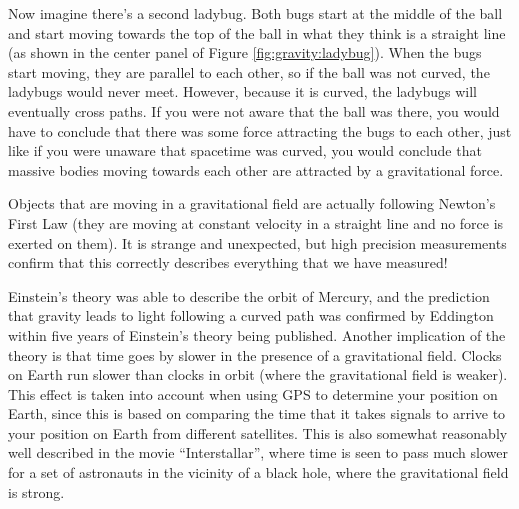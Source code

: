 
Now imagine there's a second ladybug. Both bugs start at the middle of the ball and start moving towards the top of the ball in what they think is a straight line (as shown in the center panel of Figure \ref{fig:gravity:ladybug}). When the bugs start moving, they are parallel to each other, so if the ball was not curved, the ladybugs would never meet. However, because it is curved, the ladybugs will eventually cross paths. If you were not aware that the ball was there, you would have to conclude that there was some force attracting the bugs to each other, just like if you were unaware that spacetime was curved, you would conclude that massive bodies moving towards each other are attracted by a gravitational force.

Objects that are moving in a gravitational field are actually following Newton's First Law (they are moving at constant velocity in a straight line and no force is exerted on them). It is strange and unexpected, but high precision measurements confirm that this correctly describes everything that we have measured!

Einstein's theory was able to describe the orbit of Mercury, and the prediction that gravity leads to light following a curved path was confirmed by Eddington within five years of Einstein's theory being published. Another implication of the theory is that time goes by slower in the presence of a gravitational field. Clocks on Earth run slower than clocks in orbit (where the gravitational field is weaker). This effect is taken into account when using GPS to determine your position on Earth, since this is based on comparing the time that it takes signals to arrive to your position on Earth from different satellites. This is also somewhat reasonably well described in the movie ``Interstallar'', where time is seen to pass much slower for a set of astronauts in the vicinity of a black hole, where the gravitational field is strong.

\newpage

